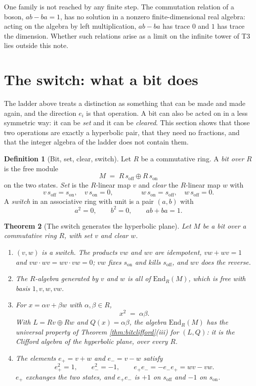 \documentclass[11pt]{article}
\theoremstyle{plain}
\newtheorem{theorem}{Theorem}[section]
\theoremstyle{definition}
\theoremstyle{plain}
\theoremstyle{definition}
\newtheorem{definition}[theorem]{Definition}
\begin{document}
One family is not reached by any finite step. The commutation relation of a boson, $ab - ba = 1$, has no solution in a nonzero finite-dimensional real algebra: acting on the algebra by left multiplication, $ab - ba$ has trace $0$ and $1$ has trace the dimension. Whether such relations arise as a limit on the infinite tower of T3 \cite{ButlerT3} lies outside this note.

\section{The switch: what a bit does}\label{sec:switch}

The ladder above treats a distinction as something that can be made and made again, and the direction $e_{i}$ is that operation. A bit can also be acted on in a less symmetric way: it can be \emph{set} and it can be \emph{cleared}. This section shows that those two operations are exactly a hyperbolic pair, that they need no fractions, and that the integer algebra of the ladder does not contain them.

\begin{definition}[Bit, set, clear, switch]\label{def:switch}
Let $R$ be a commutative ring. A \emph{bit over $R$} is the free module
\[
M \;=\; R\,s_{\mathrm{off}} \oplus R\,s_{\mathrm{on}}
\]
on the two states. \emph{Set} is the $R$-linear map $v$ and \emph{clear} the $R$-linear map $w$ with
\[
v\,s_{\mathrm{off}} = s_{\mathrm{on}}, \quad v\,s_{\mathrm{on}} = 0, \qquad\qquad w\,s_{\mathrm{on}} = s_{\mathrm{off}}, \quad w\,s_{\mathrm{off}} = 0 .
\]
A \emph{switch} in an associative ring with unit is a pair $(a, b)$ with
\[
a^{2} = 0, \qquad b^{2} = 0, \qquad ab + ba = 1 .
\]
\end{definition}

\begin{theorem}[The switch generates the hyperbolic plane]\label{thm:switch}
Let $M$ be a bit over a commutative ring $R$, with set $v$ and clear $w$.
\begin{enumerate}
\item[(i)] $(v, w)$ is a switch. The products $vw$ and $wv$ are idempotent, $vw + wv = 1$ and $vw \cdot wv = wv \cdot vw = 0$; $vw$ fixes $s_{\mathrm{on}}$ and kills $s_{\mathrm{off}}$, and $wv$ does the reverse.
\item[(ii)] The $R$-algebra generated by $v$ and $w$ is all of $\mathrm{End}_{R}(M)$, which is free with basis $1, v, w, vw$.
\item[(iii)] For $x = \alpha v + \beta w$ with $\alpha, \beta \in R$,
\[
x^{2} \;=\; \alpha\beta .
\]
With $L = Rv \oplus Rw$ and $Q(x) = \alpha\beta$, the algebra $\mathrm{End}_{R}(M)$ has the universal property of Theorem \ref{thm:bitclifford}(iii) for $(L, Q)$: it is the Clifford algebra of the hyperbolic plane, over every $R$.
\item[(iv)] The elements $e_{+} = v + w$ and $e_{-} = v - w$ satisfy
\[
e_{+}^{2} = 1, \qquad e_{-}^{2} = -1, \qquad e_{+}e_{-} = -e_{-}e_{+} = wv - vw .
\]
$e_{+}$ exchanges the two states, and $e_{+}e_{-}$ is $+1$ on $s_{\mathrm{off}}$ and $-1$ on $s_{\mathrm{on}}$.
\end{enumerate}
\end{theorem}
\end{document}
